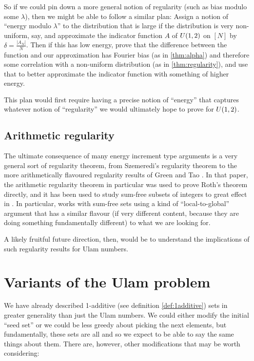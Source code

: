 \documentclass{report}
\theoremstyle{remark}
\numberwithin{equation}{section}
\begin{document}
So if we could pin down a more general notion of regularity (such as
bias modulo some $\lambda$), then we might be able to follow a similar
plan: Assign a notion of ``energy modulo $\lambda$'' to the
distribution that is large if the distribution is very non-uniform,
say, and approximate the indicator function $A$ of $U(1,2)$ on
$[N]$ by $\delta = \frac{|A_N|}{N}$.  Then if this has low energy,
prove that the difference between the function and our approximation
has Fourier bias (as in \ref{thm:alpha}) and therefore some
correlation with a non-uniform distribution (as in
\ref{thm:regularity}), and use that to better approximate the
indicator function with something of higher energy.

This plan would first require having a precise notion of ``energy''
that captures whatever notion of ``regularity'' we would ultimately
hope to prove for $U(1,2)$.

\subsection{Arithmetic regularity}

The ultimate consequence of many energy increment type arguments is a
very general sort of regularity theorem, from Szemeredi's regularity
theorem to the more arithmetically flavoured regularity results of
Green and Tao \cite{green:bsm2010}.  In that paper, the arithmetic
regularity theorem in particular was used to prove Roth's theorem
directly, and it has been used to study sum-free subsets of integers
to great effect in \cite{eberhard:ann2014}.  In particular,
\cite{eberhard:ann2014} works with sum-free sets using a kind of
``local-to-global'' argument that has a similar flavour (if very
different content, because they are doing something fundamentally
different) to what we are looking for.  

A likely fruitful future direction, then, would be to understand the
implications of such regularity results for Ulam numbers.  

\section{Variants of the Ulam problem}

We have already described 1-additive (see definition
\ref{def:1additive}) sets in greater generality than just the Ulam
numbers.  We could either modify the initial ``seed set'' or we could
be less greedy about picking the next elements, but fundamentally,
these sets are all \relevant and so we expect to be able to say the
same things about them.  There are, however, other modifications that
may be worth considering:
\end{document}
